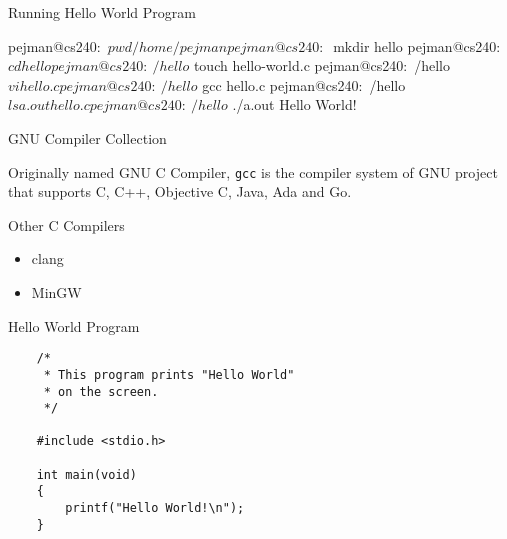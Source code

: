 \documentclass[compress]{beamer}
\begin{document}
\begin{slide}
	\begin{block}{Running Hello World Program}

	\begin{terminal}
	pejman@cs240:~$ pwd
	/home/pejman
	pejman@cs240:~$ mkdir hello
	pejman@cs240:~$ cd hello
	pejman@cs240:~/hello$ touch hello-world.c
	pejman@cs240:~/hello$ vi hello.c
	pejman@cs240:~/hello$ gcc hello.c
	pejman@cs240:~/hello$ ls
	a.out   hello.c
	pejman@cs240:~/hello$ ./a.out
	Hello World!
	\end{terminal}

	\end{block}
\end{slide}

\begin{slide}
	\begin{block}{GNU Compiler Collection}

	Originally named GNU C Compiler, \alert{\texttt{gcc}} is the compiler system of GNU project that supports C, C++, Objective C, Java, Ada and Go.

	\end{block}
	\begin{block}{Other C Compilers}

	\begin{itemize}
	\item[] clang
	\item[] MinGW
	\end{itemize}

	\end{block}
\end{slide}

\begin{slide}
	\begin{block}{Hello World Program}

	\begin{verbatim}
	/*
	 * This program prints "Hello World"
	 * on the screen.
	 */

	#include <stdio.h>

	int main(void)
	{
	    printf("Hello World!\n");
	}
	\end{verbatim}

	\end{block}
\end{slide}
\end{document}
